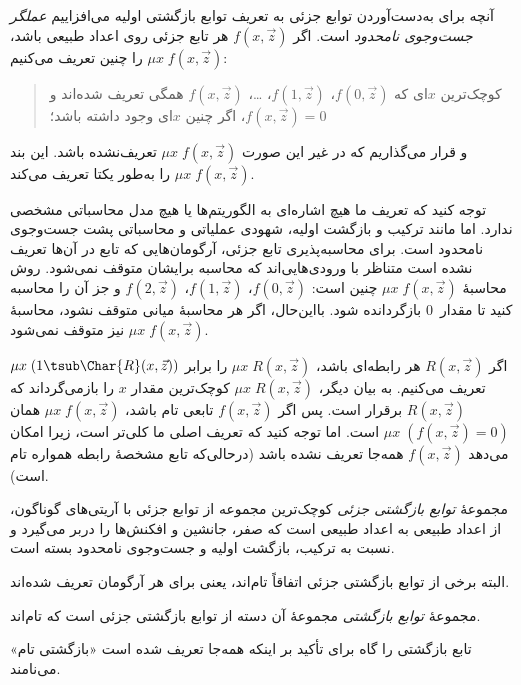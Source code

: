 \documentclass[../../../include/open-logic-section]{subfiles}
\begin{document}
آنچه برای به‌دست‌آوردن توابع جزئی به تعریف توابع بازگشتی اولیه
می‌افزاییم \emph{عملگر جست‌وجوی نامحدود} است. اگر $f(x,\vec z)$ هر
تابع جزئی روی اعداد طبیعی باشد، $\mu x\;f(x,\vec z)$ را چنین تعریف
می‌کنیم:
\begin{quote}
  کوچک‌ترین $x$ای که $f(0,\vec z)$، $f(1,\vec z)$، \dots،
  $f(x,\vec z)$ همگی تعریف شده‌اند و $f(x,\vec z)=0$، اگر چنین
  $x$ای وجود داشته باشد؛
\end{quote}
و قرار می‌گذاریم که در غیر این صورت $\mu x\;f(x,\vec z)$ تعریف‌نشده
باشد. این بند $\mu x\;f(x,\vec z)$ را به‌طور یکتا تعریف می‌کند.

\begin{explain}
توجه کنید که تعریف ما هیچ اشاره‌ای به
الگوریتم‌ها یا هیچ مدل محاسباتی مشخصی ندارد. اما مانند ترکیب و بازگشت
اولیه، شهودی عملیاتی و محاسباتی پشت جست‌وجوی نامحدود است. برای
محاسبه‌پذیری تابع جزئی، آرگومان‌هایی که تابع در آن‌ها تعریف نشده است
متناظر با ورودی‌هایی‌اند که محاسبه برایشان متوقف نمی‌شود. روش محاسبهٔ
$\mu x\;f(x,\vec z)$ چنین است: $f(0,\vec z)$، $f(1,\vec z)$،
$f(2,\vec z)$ و جز آن را محاسبه کنید تا مقدار~$0$ بازگردانده شود.
بااین‌حال، اگر هر محاسبهٔ میانی متوقف نشود، محاسبهٔ
$\mu x\;f(x,\vec z)$ نیز متوقف نمی‌شود.
\end{explain}

اگر $R(x,\vec z)$ هر رابطه‌ای باشد، $\mu x\;R(x,\vec z)$ را برابر
$\mu x\;(1\tsub\Char{R}(x,\vec z))$ تعریف می‌کنیم. به بیان دیگر،
$\mu x\;R(x,\vec z)$ کوچک‌ترین مقدار $x$ را بازمی‌گرداند که
$R(x,\vec z)$ برقرار است. پس اگر $f(x,\vec z)$ تابعی تام باشد،
$\mu x\;f(x,\vec z)$ همان $\mu x\;(f(x,\vec z)=0)$ است. اما توجه
کنید که تعریف اصلی ما کلی‌تر است، زیرا امکان می‌دهد $f(x,\vec z)$
همه‌جا تعریف نشده باشد (درحالی‌که تابع مشخصهٔ رابطه همواره تام است).

\begin{defn}
مجموعهٔ \emph{توابع بازگشتی جزئی} کوچک‌ترین مجموعه از توابع جزئی با
آریتی‌های گوناگون، از اعداد طبیعی به اعداد طبیعی است که صفر، جانشین و
افکنش‌ها را دربر می‌گیرد و نسبت به ترکیب، بازگشت اولیه و جست‌وجوی
نامحدود بسته است.
\end{defn}

البته برخی از توابع بازگشتی جزئی اتفاقاً تام‌اند، یعنی برای هر
آرگومان تعریف شده‌اند.

\begin{defn}
مجموعهٔ \emph{توابع بازگشتی} مجموعهٔ آن دسته از توابع بازگشتی جزئی
است که تام‌اند.
\end{defn}

تابع بازگشتی را گاه برای تأکید بر اینکه همه‌جا تعریف شده است
«بازگشتی تام» می‌نامند.
\end{document}
